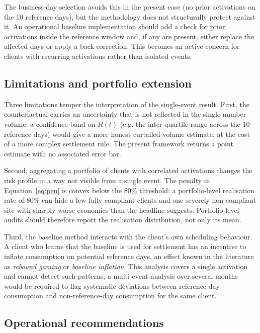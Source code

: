 \documentclass{article}
\begin{document}
The business-day selection avoids this in the present case (no prior activations on the 10 reference days), but the methodology does not structurally protect against it. An operational baseline implementation should add a check for prior activations inside the reference window and, if any are present, either replace the affected days or apply a back-correction. This becomes an active concern for clients with recurring activations rather than isolated events.

\subsection{Limitations and portfolio extension}

Three limitations temper the interpretation of the single-event result. First, the counterfactual carries an uncertainty that is not reflected in the single-number volume: a confidence band on $R(t)$ (e.g. the inter-quartile range across the 10 reference days) would give a more honest curtailed-volume estimate, at the cost of a more complex settlement rule. The present framework returns a point estimate with no associated error bar.

Second, aggregating a portfolio of clients with correlated activations changes the risk profile in a way not visible from a single event. The penalty in Equation~\eqref{eq:pen} is convex below the 80\% threshold: a portfolio-level realisation rate of 80\% can hide a few fully compliant clients and one severely non-compliant site with sharply worse economics than the headline suggests. Portfolio-level audits should therefore report the realisation distribution, not only its mean.

Third, the baseline method interacts with the client's own scheduling behaviour. A client who learns that the baseline is used for settlement has an incentive to inflate consumption on potential reference days, an effect known in the literature as \textit{rebound gaming} or \textit{baseline inflation}. This analysis covers a single activation and cannot detect such patterns; a multi-event analysis over several months would be required to flag systematic deviations between reference-day consumption and non-reference-day consumption for the same client.

\subsection{Operational recommendations}
\end{document}
